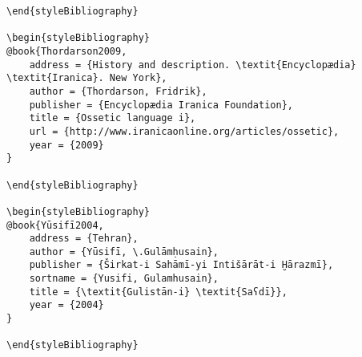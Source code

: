 \documentclass[output=paper]{langsci/langscibook}
\begin{document}
\begin{verbatim}
\end{styleBibliography}

\begin{styleBibliography}
@book{Thordarson2009,
	address = {History and description. \textit{Encyclopædia} \textit{Iranica}. New York},
	author = {Thordarson, Fridrik},
	publisher = {Encyclopædia Iranica Foundation},
	title = {Ossetic language i},
	url = {http://www.iranicaonline.org/articles/ossetic},
	year = {2009}
}

\end{styleBibliography}

\begin{styleBibliography}
@book{Yūsifī2004,
	address = {Tehran},
	author = {Yūsifī, \.Gulāmḥusain},
	publisher = {Širkat-i Sahāmī-yi Intišārāt-i Ḫārazmī},
	sortname = {Yusifi, Gulamhusain},
	title = {\textit{Gulistān-i} \textit{Saʕdī}},
	year = {2004}
}

\end{styleBibliography}
\end{verbatim} 
{\sloppy\printbibliography[heading=subbibliography,notkeyword=this]}
\end{document}

